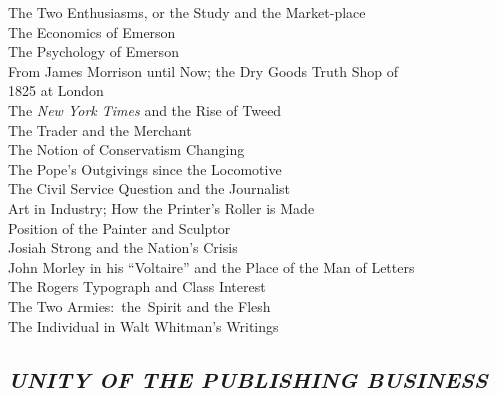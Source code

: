 \documentclass[twoside,symmetric,nobib,justified]{tufte-book}
\begin{document}
The Two Enthusiasms, or the Study and the Market-place~\\
The Economics of Emerson~\\
The Psychology of Emerson~\\
From James Morrison until Now; the Dry Goods Truth Shop of\\
\hspace*{.25in}1825 at
London~\\
The \emph{New York Times} and the Rise of Tweed~\\
The Trader and the Merchant ~\\
The Notion of Conservatism Changing~\\
The Pope's Outgivings since the Locomotive~\\
The Civil Service Question and the Journalist~\\
Art in Industry; How the Printer's Roller is Made~\\
Position of the Painter and Sculptor~\\
Josiah Strong and the Nation's Crisis~\\
John Morley in his ``Voltaire'' and the Place of the Man of Letters~\\
The Rogers Typograph and Class Interest~\\
The Two Armies:~the~Spirit and the Flesh~\\
The Individual in Walt Whitman's Writings~


\hypertarget{unity-of-the-publishing-business}{%
\subsection{\texorpdfstring{\emph{UNITY OF THE PUBLISHING
BUSINESS}}{UNITY OF THE PUBLISHING BUSINESS}}\label{unity-of-the-publishing-business}}
\end{document}
